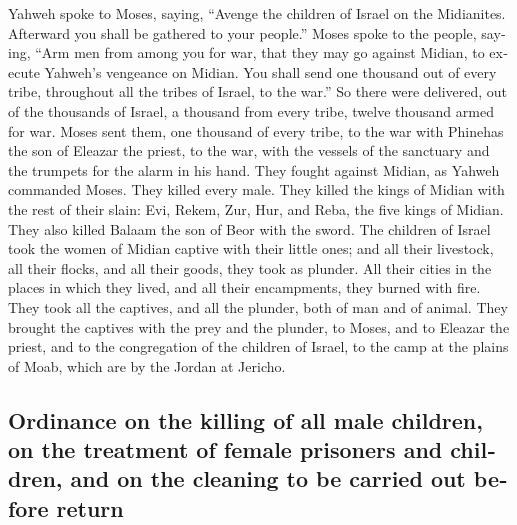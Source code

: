 \begin{paracol}{2}
\begin{otherlanguage}{english}
 Yahweh spoke to Moses, saying,  ``Avenge
the children of Israel on the Midianites. Afterward you shall be
gathered to your people.''  Moses spoke to the people,
saying, ``Arm men from among you for war, that they may go against
Midian, to execute Yahweh's vengeance on Midian.  You
shall send one thousand out of every tribe, throughout all the tribes of
Israel, to the war.''  So there were delivered, out of the
thousands of Israel, a thousand from every tribe, twelve thousand armed
for war.  Moses sent them, one thousand of every tribe, to
the war with Phinehas the son of Eleazar the priest, to the war, with
the vessels of the sanctuary and the trumpets for the alarm in his hand.
 They fought against Midian, as Yahweh commanded Moses.
They killed every male.  They killed the kings of Midian
with the rest of their slain: Evi, Rekem, Zur, Hur, and Reba, the five
kings of Midian. They also killed Balaam the son of Beor with the sword.
 The children of Israel took the women of Midian captive
with their little ones; and all their livestock, all their flocks, and
all their goods, they took as plunder.  All their cities
in the places in which they lived, and all their encampments, they
burned with fire.  They took all the captives, and all
the plunder, both of man and of animal.  They brought the
captives with the prey and the plunder, to Moses, and to Eleazar the
priest, and to the congregation of the children of Israel, to the camp
at the plains of Moab, which are by the Jordan at Jericho.

\hypertarget{ordinance-on-the-killing-of-all-male-children-on-the-treatment-of-female-prisoners-and-children-and-on-the-cleaning-to-be-carried-out-before-return}{%
\subsection{Ordinance on the killing of all male children, on the
treatment of female prisoners and children, and on the cleaning to be
carried out before
return}\label{ordinance-on-the-killing-of-all-male-children-on-the-treatment-of-female-prisoners-and-children-and-on-the-cleaning-to-be-carried-out-before-return}}


\end{otherlanguage}
\end{paracol}
